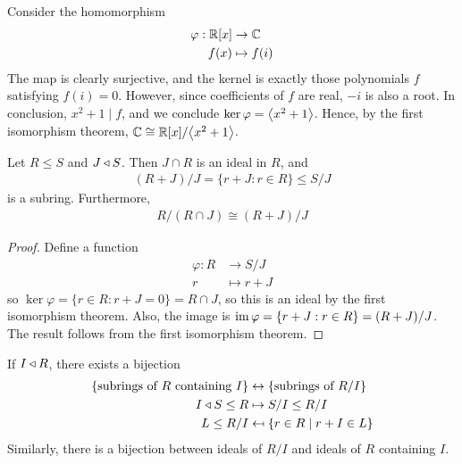 \documentclass{../../template/note}
\begin{document}
    \begin{example}
        Consider the homomorphism
        \begin{align*}
            \varphi: \mathbb R[x] &\to \mathbb C \\
            f(x) &\mapsto f(i)
        \end{align*}
        The map is clearly surjective, and the kernel is exactly those polynomials $f$ satisfying $f(i) = 0$. However, since coefficients of $f$ are real, $-i$ is also a root. In conclusion, $x^2 + 1 \mid f$, and we conclude $\ker \varphi = \left \langle x^2+1 \right \rangle$. Hence, by the first isomorphism theorem, $\mathbb C \cong \mathbb R[x]/\!\left \langle x^2+1 \right \rangle$.        
    \end{example}
    
    \begin{proposition}
        Let $R \leq S$ and $J \triangleleft S$. Then $J \cap R$ is an ideal in $R$, and
        \begin{align*}
            (R+J)/J = \{r + J: r \in R\} \leq S/J
        \end{align*}
        is a subring. Furthermore,
        \begin{align*}
            R/(R \cap J) \cong (R+J)/J
        \end{align*}
    \end{proposition}
    
    \begin{proof}
        Define a function
        \begin{align*}
            \varphi: R &\to S/J \\
            r &\mapsto r + J
        \end{align*}
        so $\ker \varphi = \{r \in R: r + J = 0\} = R \cap J$, so this is an ideal by the first isomorphism theorem. Also, the image is $\operatorname{im} \varphi = \{r + J: r \in R\} = (R + J)/J$. The result follows from the first isomorphism theorem.        
    \end{proof}
    

    \begin{theorem}
        If $I \triangleleft R$, there exists a bijection
        \begin{align*}
            \{\text{subrings of } R \text{ containing } I\} &\leftrightarrow \{\text{subrings of } R/I\} \\
            I \triangleleft S \leq R &\mapsto S/I \leq R/I \\
            L \leq R/I &\mapsfrom \{r \in R \mid r + I \in L\}
        \end{align*}
        Similarly, there is a bijection between ideals of $R/I$ and ideals of $R$ containing $I$.        
    \end{theorem}
    
\end{document}
